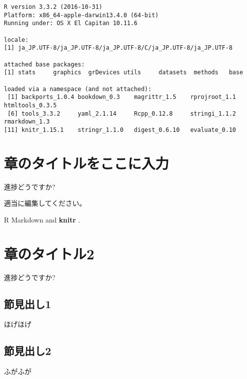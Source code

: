 \documentclass[]{book}
\begin{document}
\begin{verbatim}
R version 3.3.2 (2016-10-31)
Platform: x86_64-apple-darwin13.4.0 (64-bit)
Running under: OS X El Capitan 10.11.6

locale:
[1] ja_JP.UTF-8/ja_JP.UTF-8/ja_JP.UTF-8/C/ja_JP.UTF-8/ja_JP.UTF-8

attached base packages:
[1] stats     graphics  grDevices utils     datasets  methods   base     

loaded via a namespace (and not attached):
 [1] backports_1.0.4 bookdown_0.3    magrittr_1.5    rprojroot_1.1   htmltools_0.3.5
 [6] tools_3.3.2     yaml_2.1.14     Rcpp_0.12.8     stringi_1.1.2   rmarkdown_1.3  
[11] knitr_1.15.1    stringr_1.1.0   digest_0.6.10   evaluate_0.10  
\end{verbatim}

\chapter{章のタイトルをここに入力}

進捗どうですか?

適当に編集してください。

R Markdown and \textbf{knitr} \citep{xie2015}.

\chapter{章のタイトル2}\label{2}

進捗どうですか?

\section{節見出し1}\label{1}

ほげほげ

\section{節見出し2}\label{2}

ふがふが


\end{document}
